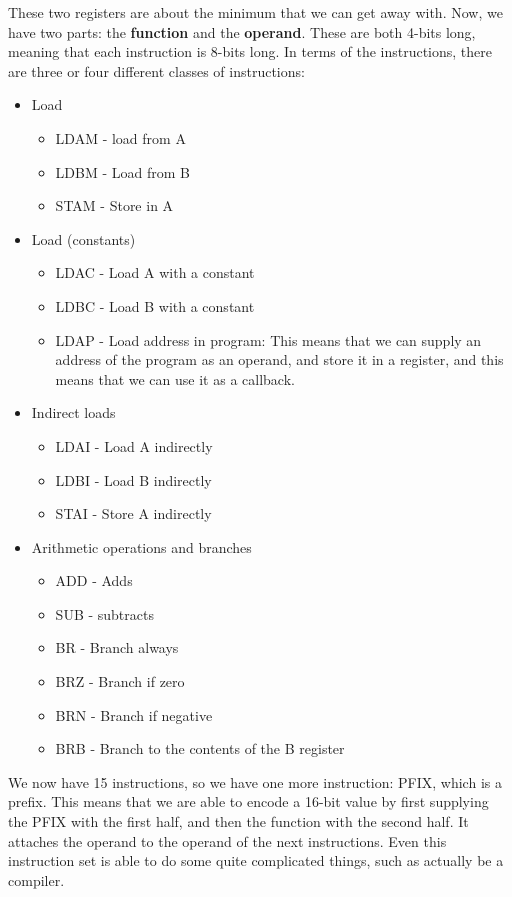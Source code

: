 \documentclass[11pt,a4paper,titlepage,dvipsnames,cmyk]{scrartcl}
\begin{document}
These two registers are about the minimum that we can get away with. Now,
we have two parts: the \textbf{function} and the \textbf{operand}. These
are both 4-bits long, meaning that each instruction is 8-bits long. In
terms of the instructions, there are three or four different classes of
instructions:
\begin{itemize}
    \item Load
    \begin{itemize}
        \item LDAM - load from A
        \item LDBM - Load from B
        \item STAM - Store in A
    \end{itemize}
    \item Load (constants)
    \begin{itemize}
        \item LDAC - Load A with a constant
        \item LDBC - Load B with a constant
        \item LDAP - Load address in program: This means that we can
            supply an address of the program as an operand, and store it
            in a register, and this means that we can use it as a
            callback.
    \end{itemize}
    \item Indirect loads
    \begin{itemize}
        \item LDAI - Load A indirectly
        \item LDBI - Load B indirectly
        \item STAI - Store A indirectly
    \end{itemize}
    \item Arithmetic operations and branches
    \begin{itemize}
        \item ADD - Adds
        \item SUB - subtracts
        \item BR - Branch always
        \item BRZ - Branch if zero
        \item BRN - Branch if negative
        \item BRB - Branch to the contents of the B register
    \end{itemize}
\end{itemize}

We now have 15 instructions, so we have one more instruction: PFIX, which
is a prefix. This means that we are able to encode a 16-bit value by first
supplying the PFIX with the first half, and then the function with the
second half. It attaches the operand to the operand of the next
instructions. Even this instruction set is able to do some quite
complicated things, such as actually be a compiler. 
\end{document}
